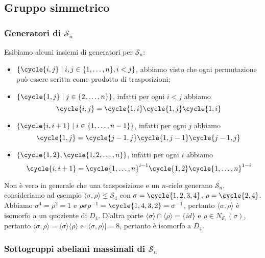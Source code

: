 \documentclass[11pt]{scrartcl}
\begin{document}
	\newpage
	
	\subsection{Gruppo simmetrico}
	
	\subsubsection{Generatori di $\mathcal{S}_n$}
	
	Esibiamo alcuni insiemi di generatori per $\mathcal{S}_n$:
	
	\begin{itemize}
		\item $\{\cycle{i, j} \mid i, j \in\{1, \ldots, n\}, i < j\}$, abbiamo visto 
		che ogni permutazione può essere scritta come prodotto di trasposizioni;
		\item $\{\cycle{1, j}\mid j \in \{2, \ldots, n\}\}$, infatti per ogni $i<j$ abbiamo
		\[
		\cycle{i, j} = \cycle{1, i}\cycle{1, j}\cycle{1, i}
		\]
		\item $\{\cycle{i, i + 1}\mid i \in\{1, \ldots, n - 1\}\}$,
		infatti per ogni $j$ abbiamo 
		\[
		\cycle{1, j} = \cycle{j - 1, j}\cycle{1, j - 1}\cycle{j - 1, j}
		\]
		\item $\{\cycle{1, 2}, \cycle{1, 2, \ldots, n}\}$, infatti per ogni
		$i$ abbiamo 
		\[
		\cycle{i, i + 1} = \cycle{1, \ldots, n}^{i - 1}\cycle{1, 2}\cycle{1, \ldots, n}^{1 - i}
		\]
	\end{itemize}
	
	\begin{remark}
		Non è vero in generale che una trasposizione e un $n$-ciclo generano $\mathcal{S}_n$,
		consideriamo ad esempio $\langle\sigma, \rho\rangle\leqslant \mathcal{S}_4$ con
		$\sigma = \cycle{1, 2, 3, 4}$, $\rho = \cycle{2, 4}$. Abbiamo
		$\sigma^4 = \rho^2 = 1$ e $\rho\sigma\rho^{-1} = \cycle{1, 4, 3, 2} =
		\sigma^{-1}$, pertanto $\langle\sigma, \rho\rangle$ è isomorfo a un 
		quoziente di $D_4$. D'altra parte $\langle\sigma\rangle\cap \langle\rho\rangle = \{id\}$
		e $\rho \in N_{\mathcal{S}_4}(\sigma)$, pertanto $\langle\sigma, \rho\rangle =
		\langle\sigma\rangle\langle\rho\rangle$ e $|\langle\sigma, \rho\rangle| = 8$,
		pertanto è isomorfo a $D_4$. 
	\end{remark}
	
	\subsubsection{Sottogruppi abeliani massimali di $\mathcal{S}_n$}
	
\end{document}
